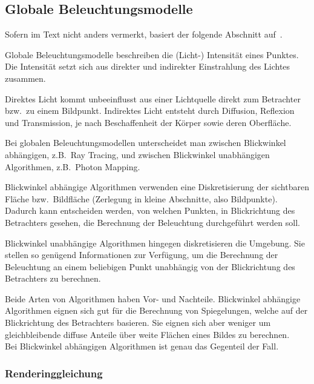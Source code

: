
\subsection{Globale Beleuchtungsmodelle}
\label{subsec:global_illumination_models}

Sofern im Text nicht anders vermerkt, basiert der folgende Abschnitt
auf~\cite[S. 775ff]{foley_computer_1996}.

Globale Beleuchtungsmodelle beschreiben die (Licht-) Intensität eines
Punktes. Die Intensität setzt sich aus direkter und indirekter
Einstrahlung des Lichtes zusammen.

Direktes Licht kommt unbeeinflusst aus einer Lichtquelle direkt zum
Betrachter bzw.~zu einem Bildpunkt. Indirektes Licht entsteht durch
Diffusion, Reflexion und Transmission, je nach Beschaffenheit der Körper
sowie deren Oberfläche.

Bei globalen Beleuchtungsmodellen unterscheidet man zwischen Blickwinkel
abhängigen, z.B.~Ray Tracing, und zwischen Blickwinkel
unabhängigen Algorithmen, z.B.~Photon Mapping.

Blickwinkel abhängige Algorithmen verwenden eine Diskretisierung der
sichtbaren Fläche bzw.\ Bildfläche (Zerlegung in kleine Abschnitte, also
Bildpunkte). Dadurch kann entscheiden werden, von welchen Punkten, in
Blickrichtung des Betrachters gesehen, die Berechnung der Beleuchtung
durchgeführt werden soll.

Blickwinkel unabhängige Algorithmen hingegen diskretisieren die
Umgebung. Sie stellen so genügend Informationen zur Verfügung, um die
Berechnung der Beleuchtung an einem beliebigen Punkt unabhängig von der
Blickrichtung des Betrachters zu berechnen.

Beide Arten von Algorithmen haben Vor- und Nachteile.  Blickwinkel
abhängige Algorithmen eignen sich gut für die Berechnung von
Spiegelungen, welche auf der Blickrichtung des Betrachters basieren.
Sie eignen sich aber weniger um gleichbleibende diffuse Anteile über
weite Flächen eines Bildes zu berechnen.\\
Bei Blickwinkel abhängigen Algorithmen ist genau das Gegenteil der Fall.

\subsubsection{Renderinggleichung}
\label{ssubsec:rendering_equation}

